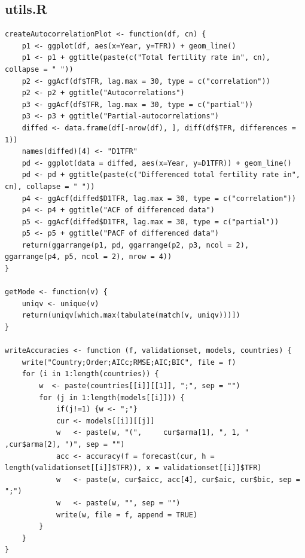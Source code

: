 \documentclass[a4paper, 12pt]{scrartcl}
\begin{document}
\subsection{utils.R}
\begin{lstlisting}[caption={A file containing some helpful functions, mostly for creating pretty plots.}]
createAutocorrelationPlot <- function(df, cn) {
	p1 <- ggplot(df, aes(x=Year, y=TFR)) + geom_line()
	p1 <- p1 + ggtitle(paste(c("Total fertility rate in", cn), collapse = " "))
	p2 <- ggAcf(df$TFR, lag.max = 30, type = c("correlation"))
	p2 <- p2 + ggtitle("Autocorrelations")
	p3 <- ggAcf(df$TFR, lag.max = 30, type = c("partial"))
	p3 <- p3 + ggtitle("Partial-autocorrelations")
	diffed <- data.frame(df[-nrow(df), ], diff(df$TFR, differences = 1))
	names(diffed)[4] <- "D1TFR"
	pd <- ggplot(data = diffed, aes(x=Year, y=D1TFR)) + geom_line()
	pd <- pd + ggtitle(paste(c("Differenced total fertility rate in", cn), collapse = " "))
	p4 <- ggAcf(diffed$D1TFR, lag.max = 30, type = c("correlation"))
	p4 <- p4 + ggtitle("ACF of differenced data")
	p5 <- ggAcf(diffed$D1TFR, lag.max = 30, type = c("partial"))
	p5 <- p5 + ggtitle("PACF of differenced data")
	return(ggarrange(p1, pd, ggarrange(p2, p3, ncol = 2), ggarrange(p4, p5, ncol = 2), nrow = 4))
}

getMode <- function(v) {
	uniqv <- unique(v)
	return(uniqv[which.max(tabulate(match(v, uniqv)))])
}

writeAccuracies <- function (f, validationset, models, countries) {
	write("Country;Order;AICc;RMSE;AIC;BIC", file = f)
	for (i in 1:length(countries)) {
		w  <- paste(countries[[i]][[1]], ";", sep = "")
		for (j in 1:length(models[[i]])) {
			if(j!=1) {w <- ";"}
			cur <- models[[i]][[j]]
			w   <- paste(w, "(",     cur$arma[1], ", 1, " ,cur$arma[2], ")", sep = "")
			acc <- accuracy(f = forecast(cur, h = length(validationset[[i]]$TFR)), x = validationset[[i]]$TFR)
			w   <- paste(w, cur$aicc, acc[4], cur$aic, cur$bic, sep = ";")
			w   <- paste(w, "", sep = "")
			write(w, file = f, append = TRUE)
		}
	}
}


\end{lstlisting}
\end{document}
